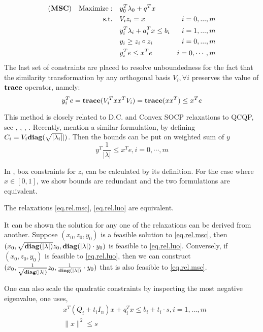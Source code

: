 \documentclass[../main]{subfiles}
\begin{document}
\begin{equation}\label{eq.rel.msc}
  \begin{aligned}
    (\textbf{MSC}) \quad \mathrm{Maximize: }\quad & y_0 ^T\lambda_0 + q^Tx                              \\
    \mathrm{s.t.} \quad                        & V_i z_i = x                        & i=0,...,m      \\
                                               & y_i ^T\lambda_i  + a_i^Tx  \le b_i & i=1,...,m      \\
                                               & y_i \ge z_i \circ z_i              & i=0,...,m      \\
                                               & y_i^Te \le x^Te                    & i=0, \cdots, m
  \end{aligned}
\end{equation}
The last set of constraints are placed to resolve unboundedness for the fact that the similarity transformation by any orthogonal basis \(V_i, \forall i\) preserves the value of \(\textbf{trace}\) operator, namely:
\begin{equation}
  y_i^Te = \textbf{trace}( V_i^Txx^T V_i) = \textbf{trace} (xx^T) \le x^Te
\end{equation}

This method is closely related to D.C. and Convex SOCP relaxations to QCQP, see \cite{zheng_convex_2011}, \cite{zheng_nonconvex_2011}, \cite{jiang_simultaneous_2016}, \cite{ye_new_2003}. Recently, \cite{luo_new_2019} mention a similar formulation, by defining \(C_i = V_i\textbf{diag}(\sqrt{|\lambda_i|}|)\). Then the bounds can be put on weighted sum of \(y\)
\begin{equation} \label{eq.rel.luo} y^T\frac{1}{|\lambda|}  \le x^Te, i=0, \cdots, m
\end{equation}


In \cite{luo_new_2019}, box constraints for \(z_i\) can be calculated by its definition. For the case where \(x\in [0, 1]\), we show bounds are redundant and the two formulations are equivalent.

\begin{thm}
  The relaxations \eqref{eq.rel.msc}, \eqref{eq.rel.luo} are equivalent.
\end{thm}
It can be shown the solution for any one of the relaxations can be derived from another.  Suppose $(x_0, z_0, y_0)$ is a feasible solution to \eqref{eq.rel.msc}, then $(x_0, \sqrt{\textbf{diag}(|\lambda|)} z_0, \textbf{diag}(|\lambda|) \cdot y_0)$ is feasible to \eqref{eq.rel.luo}. Conversely, if $(x_0, z_0, y_0)$ is feasible to \eqref{eq.rel.luo}, then we can construct $(x_0, \frac{1}{\sqrt{\textbf{diag}(|\lambda|)}} z_0, \frac{1}{\textbf{diag}(|\lambda|)}\cdot y_0)$ that is also feasible to \eqref{eq.rel.msc}.

One can also scale the quadratic constraints by inspecting the most negative eigenvalue, one uses,
\begin{align*}
   & x^T(Q_i+t_i I_n) x+q_i^T x \leqslant b_i+ t_i \cdot s,i= 1,\dots, m \\
   & \|x\|^2 \le s
\end{align*}
\end{document}
